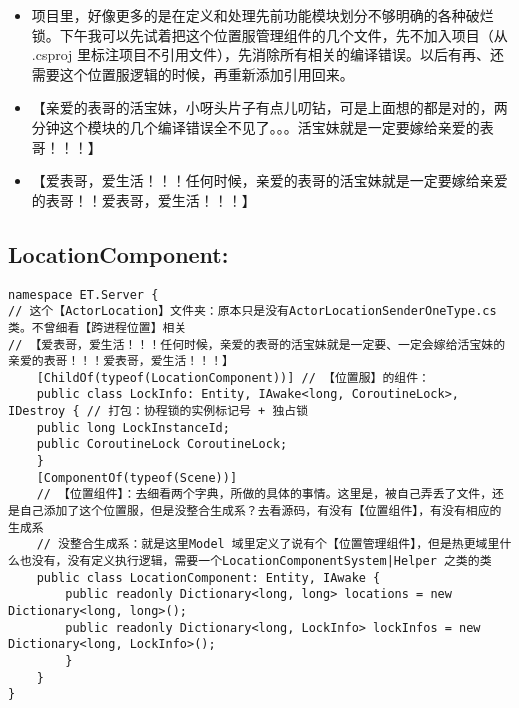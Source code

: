\documentclass[9pt, b5paper]{article}
\begin{document}
\begin{itemize}
\item 项目里，好像更多的是在定义和处理先前功能模块划分不够明确的各种破烂锁。下午我可以先试着把这个位置服管理组件的几个文件，先不加入项目（从 .csproj 里标注项目不引用文件），先消除所有相关的编译错误。以后有再、还需要这个位置服逻辑的时候，再重新添加引用回来。
\item 【亲爱的表哥的活宝妹，小呀头片子有点儿叨钻，可是上面想的都是对的，两分钟这个模块的几个编译错误全不见了。。。活宝妹就是一定要嫁给亲爱的表哥！！！】
\item 【爱表哥，爱生活！！！任何时候，亲爱的表哥的活宝妹就是一定要嫁给亲爱的表哥！！爱表哥，爱生活！！！】
\end{itemize}
\subsection{LocationComponent:}
\label{sec-5-2}
\begin{verbatim}
namespace ET.Server {
// 这个【ActorLocation】文件夹：原本只是没有ActorLocationSenderOneType.cs 类。不曾细看【跨进程位置】相关
// 【爱表哥，爱生活！！！任何时候，亲爱的表哥的活宝妹就是一定要、一定会嫁给活宝妹的亲爱的表哥！！！爱表哥，爱生活！！！】
    [ChildOf(typeof(LocationComponent))] // 【位置服】的组件：
    public class LockInfo: Entity, IAwake<long, CoroutineLock>, IDestroy { // 打包：协程锁的实例标记号 + 独占锁
    public long LockInstanceId;
    public CoroutineLock CoroutineLock;
    }
    [ComponentOf(typeof(Scene))]
    // 【位置组件】：去细看两个字典，所做的具体的事情。这里是，被自己弄丢了文件，还是自己添加了这个位置服，但是没整合生成系？去看源码，有没有【位置组件】，有没有相应的生成系
    // 没整合生成系：就是这里Model 域里定义了说有个【位置管理组件】，但是热更域里什么也没有，没有定义执行逻辑，需要一个LocationComponentSystem|Helper 之类的类
    public class LocationComponent: Entity, IAwake { 
        public readonly Dictionary<long, long> locations = new Dictionary<long, long>();
        public readonly Dictionary<long, LockInfo> lockInfos = new Dictionary<long, LockInfo>();
        }
    }
}
\end{verbatim}
\end{document}
